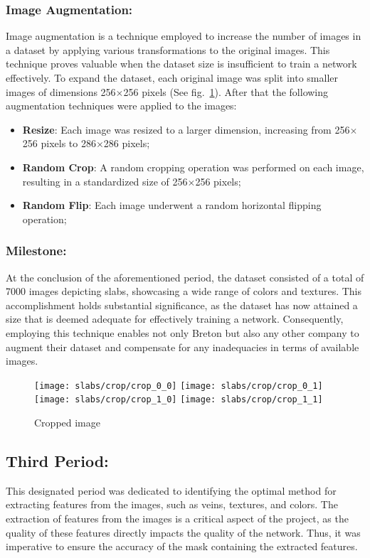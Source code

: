 \subsubsection{Image Augmentation:}
Image augmentation is a technique employed to increase the number of images in a dataset by applying various transformations to the original images. 
This technique proves valuable when the dataset size is insufficient to train a network effectively.
To expand the dataset, each original image was split into smaller images of dimensions 256$\times$256 pixels (See fig.~\ref{fig:slab-split}).
After that the following augmentation techniques were applied to the images:
\begin{itemize}
    \item  \textbf{Resize}: Each image was resized to a larger dimension, increasing from 256$\times$256 pixels to 286$\times$286 pixels;
    \item  \textbf{Random Crop}: A random cropping operation was performed on each image, resulting in a standardized size of 256$\times$256 pixels;
    \item  \textbf{Random Flip}: Each image underwent a random horizontal flipping operation;
\end{itemize}
\subsubsection{Milestone:}
At the conclusion of the aforementioned period, the dataset consisted of a total of 7000 images depicting slabs, showcasing a wide range of colors and textures. 
This accomplishment holds substantial significance, as the dataset has now attained a size that is deemed adequate for effectively training a network. 
Consequently, employing this technique enables not only Breton but also any other company to augment their dataset and compensate for any inadequacies in terms of available images.

\begin{figure}
    \centering
    \texttt{[image: slabs/crop/crop\_0\_0]}
    \texttt{[image: slabs/crop/crop\_0\_1]}\\
    \vspace{0.1cm}
    \texttt{[image: slabs/crop/crop\_1\_0]}
    \texttt{[image: slabs/crop/crop\_1\_1]}
    \caption{Cropped image}\label{fig:slab-split}
\end{figure}

\subsection{Third Period:}
This designated period was dedicated to identifying the optimal method for extracting features from the images, such as veins, textures, and colors. 
The extraction of features from the images is a critical aspect of the project, as the quality of these features directly impacts the quality of the network. 
Thus, it was imperative to ensure the accuracy of the mask containing the extracted features.

